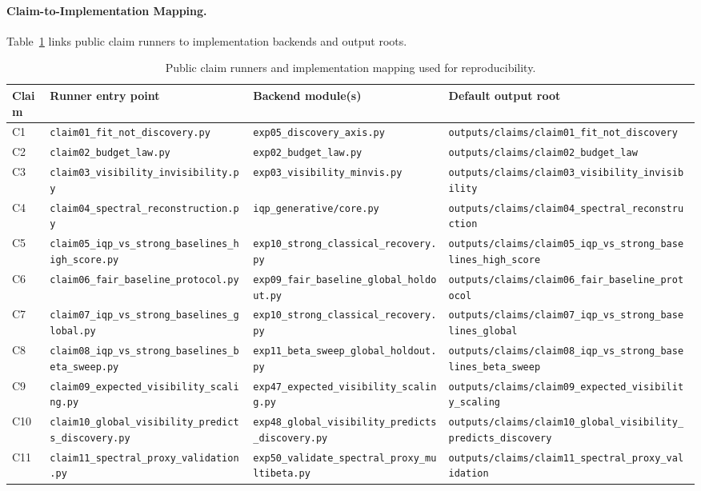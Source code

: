 \paragraph{Claim-to-Implementation Mapping.}
Table~\ref{tab:claim-mapping} links public claim runners to implementation backends and output roots.

\begin{table}[t]
\centering
\small
\begin{tabular}{p{1.1cm}p{3.5cm}p{4.6cm}p{4.8cm}}
\hline
Claim & Runner entry point & Backend module(s) & Default output root \\
\hline
C1 & \texttt{claim01\_fit\_not\_discovery.py} & \texttt{exp05\_discovery\_axis.py} & \texttt{outputs/claims/claim01\_fit\_not\_discovery} \\
C2 & \texttt{claim02\_budget\_law.py} & \texttt{exp02\_budget\_law.py} & \texttt{outputs/claims/claim02\_budget\_law} \\
C3 & \texttt{claim03\_visibility\_invisibility.py} & \texttt{exp03\_visibility\_minvis.py} & \texttt{outputs/claims/claim03\_visibility\_invisibility} \\
C4 & \texttt{claim04\_spectral\_reconstruction.py} & \texttt{iqp\_generative/core.py} & \texttt{outputs/claims/claim04\_spectral\_reconstruction} \\
C5 & \texttt{claim05\_iqp\_vs\_strong\_baselines\_high\_score.py} & \texttt{exp10\_strong\_classical\_recovery.py} & \texttt{outputs/claims/claim05\_iqp\_vs\_strong\_baselines\_high\_score} \\
C6 & \texttt{claim06\_fair\_baseline\_protocol.py} & \texttt{exp09\_fair\_baseline\_global\_holdout.py} & \texttt{outputs/claims/claim06\_fair\_baseline\_protocol} \\
C7 & \texttt{claim07\_iqp\_vs\_strong\_baselines\_global.py} & \texttt{exp10\_strong\_classical\_recovery.py} & \texttt{outputs/claims/claim07\_iqp\_vs\_strong\_baselines\_global} \\
C8 & \texttt{claim08\_iqp\_vs\_strong\_baselines\_beta\_sweep.py} & \texttt{exp11\_beta\_sweep\_global\_holdout.py} & \texttt{outputs/claims/claim08\_iqp\_vs\_strong\_baselines\_beta\_sweep} \\
C9 & \texttt{claim09\_expected\_visibility\_scaling.py} & \texttt{exp47\_expected\_visibility\_scaling.py} & \texttt{outputs/claims/claim09\_expected\_visibility\_scaling} \\
C10 & \texttt{claim10\_global\_visibility\_predicts\_discovery.py} & \texttt{exp48\_global\_visibility\_predicts\_discovery.py} & \texttt{outputs/claims/claim10\_global\_visibility\_predicts\_discovery} \\
C11 & \texttt{claim11\_spectral\_proxy\_validation.py} & \texttt{exp50\_validate\_spectral\_proxy\_multibeta.py} & \texttt{outputs/claims/claim11\_spectral\_proxy\_validation} \\
\hline
\end{tabular}
\caption{Public claim runners and implementation mapping used for reproducibility.}
\label{tab:claim-mapping}
\end{table}
